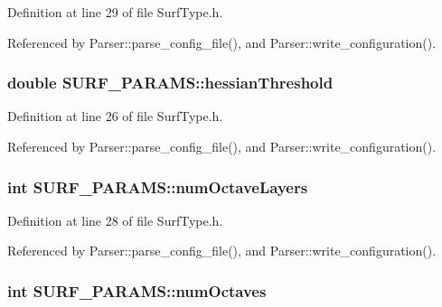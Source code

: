 \-Definition at line 29 of file \-Surf\-Type.\-h.



\-Referenced by \-Parser\-::parse\-\_\-config\-\_\-file(), and \-Parser\-::write\-\_\-configuration().

\hypertarget{class_s_u_r_f___p_a_r_a_m_s_a83a24513b75d2b36aeab2f4734e44882}{
\subsubsection[{hessian\-Threshold}]{\setlength{\rightskip}{0pt plus 5cm}double {\bf \-S\-U\-R\-F\-\_\-\-P\-A\-R\-A\-M\-S\-::hessian\-Threshold}}}
\label{class_s_u_r_f___p_a_r_a_m_s_a83a24513b75d2b36aeab2f4734e44882}


\-Definition at line 26 of file \-Surf\-Type.\-h.



\-Referenced by \-Parser\-::parse\-\_\-config\-\_\-file(), and \-Parser\-::write\-\_\-configuration().

\hypertarget{class_s_u_r_f___p_a_r_a_m_s_acec977f220c8e2632f7bd5a9761765b3}{
\subsubsection[{num\-Octave\-Layers}]{\setlength{\rightskip}{0pt plus 5cm}int {\bf \-S\-U\-R\-F\-\_\-\-P\-A\-R\-A\-M\-S\-::num\-Octave\-Layers}}}
\label{class_s_u_r_f___p_a_r_a_m_s_acec977f220c8e2632f7bd5a9761765b3}


\-Definition at line 28 of file \-Surf\-Type.\-h.



\-Referenced by \-Parser\-::parse\-\_\-config\-\_\-file(), and \-Parser\-::write\-\_\-configuration().

\hypertarget{class_s_u_r_f___p_a_r_a_m_s_a4c3319c48159907cd93e52f12c5d6610}{
\subsubsection[{num\-Octaves}]{\setlength{\rightskip}{0pt plus 5cm}int {\bf \-S\-U\-R\-F\-\_\-\-P\-A\-R\-A\-M\-S\-::num\-Octaves}}}
\label{class_s_u_r_f___p_a_r_a_m_s_a4c3319c48159907cd93e52f12c5d6610}


